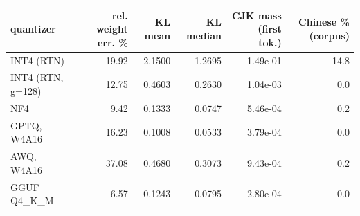 \begin{tabular}{@{}l r r r r r@{}}
\toprule
quantizer & rel. weight err. \% & KL mean & KL median & CJK mass (first tok.) & Chinese \% (corpus) \\
\midrule
INT4 (RTN) & 19.92 & 2.1500 & 1.2695 & 1.49e-01 & 14.8 \\
INT4 (RTN, g=128) & 12.75 & 0.4603 & 0.2630 & 1.04e-03 & 0.0 \\
NF4 & 9.42 & 0.1333 & 0.0747 & 5.46e-04 & 0.2 \\
GPTQ, W4A16 & 16.23 & 0.1008 & 0.0533 & 3.79e-04 & 0.0 \\
AWQ, W4A16 & 37.08 & 0.4680 & 0.3073 & 9.43e-04 & 0.2 \\
GGUF Q4\_K\_M & 6.57 & 0.1243 & 0.0795 & 2.80e-04 & 0.0 \\
\bottomrule
\end{tabular}
